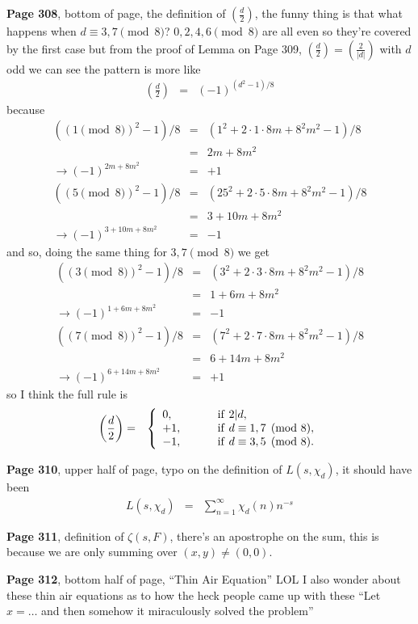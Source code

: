 \documentclass[aps,preprint,preprintnumbers,nofootinbib,showpacs,prd]{revtex4-1}
\newcommand{\nbea}{\begin{eqnarray*}}
\newcommand{\neea}{\end{eqnarray*}}
\begin{document}
{\bf Page 308}, bottom of page, the definition of $\left(\frac{d}{2}\right)$, the funny thing is that what happens when $d \equiv 3,7 \pmod{8}$? $0,2,4,6 \pmod{8}$ are all even so they're covered by the first case but from the proof of Lemma on Page 309, $\left(\frac{d}{2}\right) = \left(\frac{2}{|d|}\right)$ with $d$ odd we can see the pattern is more like
%
\nbea
\left(\frac{d}{2}\right) & = & (-1)^{(d^2-1)/8}
\neea
%
because
%
\nbea
((1 \pmod{8})^2 - 1)/8 & = & (1^2 + 2\cdot1\cdot8m + 8^2m^2 - 1)/8 \\
& = & 2m + 8m^2 \\
\to (-1)^{2m + 8m^2} & = & +1 \\
((5 \pmod{8})^2 - 1)/8 & = & (25^2 + 2\cdot5\cdot8m + 8^2m^2 - 1)/8 \\
& = & 3 + 10m + 8m^2 \\
\to (-1)^{3 + 10m + 8m^2} & = & -1
\neea
%
and so, doing the same thing for $3,7 \pmod{8}$ we get
%
\nbea
((3 \pmod{8})^2 - 1)/8 & = & (3^2 + 2\cdot3\cdot8m + 8^2m^2 - 1)/8 \\
& = & 1 + 6m + 8m^2 \\
\to (-1)^{1 + 6m + 8m^2} & = & -1 \\
((7\pmod{8})^2 - 1)/8 & = & (7^2 + 2\cdot7\cdot8m + 8^2m^2 - 1)/8 \\
& = & 6 + 14m + 8m^2 \\
\to (-1)^{6 + 14m + 8m^2} & = & +1
\neea
%
so I think the full rule is
%
\nbea
\left(\frac{d}{2}\right) & = &
\left \{
\begin{array}{l c l}
0, & ~~~ & {\rm~if~} 2|d,\\
+1, & ~~~ & {\rm~if~} d \equiv 1,7 \pmod{8},\\
-1, & ~~~ & {\rm~if~} d \equiv 3,5 \pmod{8}.
\end{array}
\right.
\neea
%

{\bf Page 310}, upper half of page, typo on the definition of $L(s,\chi_d)$, it should have been
%
\nbea
L(s,\chi_d) & = & \sum_{n=1}^\infty \chi_d(n) n^{-s}
\neea
%

{\bf Page 311}, definition of $\zeta(s,F)$, there's an apostrophe on the sum, this is because we are only summing over $(x,y) \neq (0,0)$.

{\bf Page 312}, bottom half of page, ``Thin Air Equation'' LOL I also wonder about these thin air equations as to how the heck people came up with these ``Let $x=\ldots$ and then somehow it miraculously solved the problem''
\end{document}
